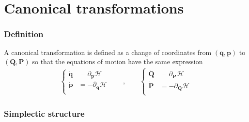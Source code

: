 \documentclass[letterpaper,10pt,english]{jupyterBook}
\begin{document}
\section{Canonical transformations}
\label{\detokenize{ch/quantum-mechanics/analytical-mechanics:canonical-transformations}}\label{\detokenize{ch/quantum-mechanics/analytical-mechanics:quantum-mechanics-analytical-mechanics-canonical-transformations}}\subsubsection*{Definition}

\sphinxAtStartPar
A canonical transformation is defined as a change of coordinates from \((\mathbf{q}, \mathbf{p})\) to \((\mathbf{Q}, \mathbf{P})\) so that the equations of motion have the same expression
\begin{equation}\label{equation:ch/quantum-mechanics/analytical-mechanics:eq:analytics:canonical:hamilton-eqns}
\begin{split}
\left\{
\begin{aligned}
  \dot{\mathbf{q}} & = \partial_{\mathbf{p}} \mathcal{H} \\
  \dot{\mathbf{p}} & =-\partial_{\mathbf{q}} \mathcal{H} \\
\end{aligned}
\right.
\qquad , \qquad
\left\{
\begin{aligned}
  \dot{\mathbf{Q}} & = \partial_{\mathbf{P}} \mathscr{H} \\
  \dot{\mathbf{P}} & =-\partial_{\mathbf{Q}} \mathscr{H} \\
\end{aligned}
\right.
\end{split}
\end{equation}\subsubsection*{Simplectic structure}
\end{document}
